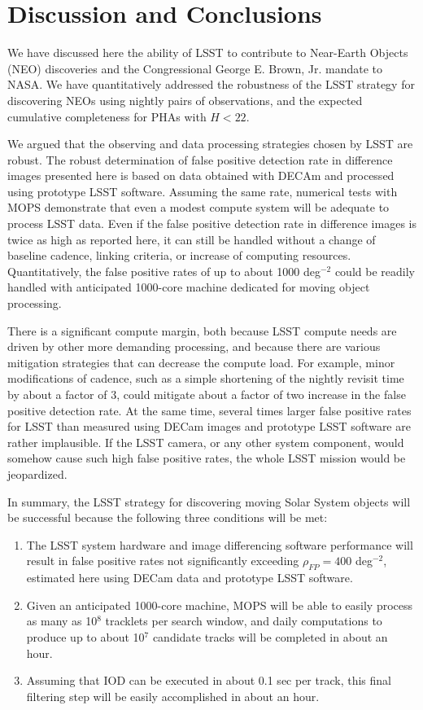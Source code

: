 

\section{Discussion and Conclusions}

We have discussed here the ability of LSST to contribute to Near-Earth Objects (NEO) discoveries and
the Congressional George E. Brown, Jr. mandate to NASA. We have quantitatively addressed 
the robustness of the LSST strategy for discovering NEOs using nightly pairs of observations, and 
the expected cumulative completeness for PHAs with $H<22$. 
 
We argued that the observing and data processing strategies chosen by LSST are robust. The
robust determination of false positive detection rate in difference images presented here is based 
on data obtained with DECAm and processed using prototype LSST software. Assuming the same rate,
numerical tests with MOPS demonstrate that even a modest compute system will be adequate to 
process LSST data. Even if the false positive detection rate in difference images is twice as high as 
reported here, it can still be handled without a change of baseline cadence, linking criteria, or 
increase of computing resources. Quantitatively, the false positive rates of up to about 
1000 deg$^{-2}$ could be readily handled with anticipated 1000-core machine dedicated for 
moving object processing. 

There is a significant compute margin, both because LSST compute needs are driven by other more 
demanding processing, and because there are various mitigation strategies that can decrease the 
compute load. For example, minor modifications of cadence, such as a simple shortening 
of the nightly revisit time by about a factor of 3, could mitigate about a factor of two increase in 
the false positive detection rate. At the same time, several times larger false positive rates for LSST
than measured using DECam images and prototype LSST software are rather implausible. If the 
LSST camera, or any other system component, would somehow cause such high false positive rates, 
the whole LSST mission would be jeopardized. 

In summary, the LSST strategy for discovering moving Solar System objects will be successful
because the following three conditions will be met: 
\begin{enumerate}
\item The LSST system hardware and image differencing software performance will result in false positive 
          rates not significantly exceeding $\rho_{FP} =  400$ deg$^{-2}$, estimated here using DECam data
          and prototype LSST software. 
\item Given an anticipated 1000-core machine, MOPS will be able to easily process as many as 
         10$^8$ tracklets per search window, and daily computations to produce up to about 10$^7$ 
         candidate tracks will be completed in about an hour. 
\item Assuming that IOD can be executed in about 0.1 sec per track, this final filtering step will 
         be easily accomplished in about an hour. 
\end{enumerate}


